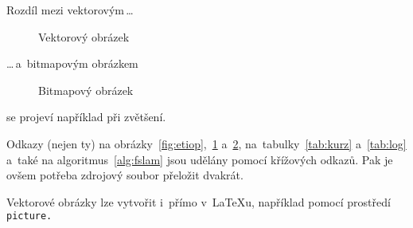 \documentclass[a4paper, 11pt]{article}
\begin{document}
\bigskip
\pagebreak

Rozdíl mezi vektorovým\,\dots

\begin{figure}[h]
	\centering

	\caption{Vektorový obrázek}
	\label{fig:oniisan}
\end{figure}
\bigskip

\noindent
\dots\,a~bitmapovým obrázkem

\begin{figure}[h]
	\centering

	\caption{Bitmapový obrázek}
	\label{fig:oniisan2}
\end{figure}
\bigskip

\noindent
se projeví například při zvětšení.

Odkazy (nejen ty) na obrázky~\ref{fig:etiop},~\ref{fig:oniisan}
a~\ref{fig:oniisan2}, na~tabulky~\ref{tab:kurz} a~\ref{tab:log} a~také
na algoritmus~\ref{alg:fslam} jsou udělány pomocí křížových odkazů. Pak je
ovšem potřeba zdrojový soubor přeložit dvakrát.

Vektorové obrázky lze vytvořit i~přímo v~\LaTeX{}u, například pomocí
prostředí\texttt{ picture.}

\pagebreak
\bigskip
\end{document}
